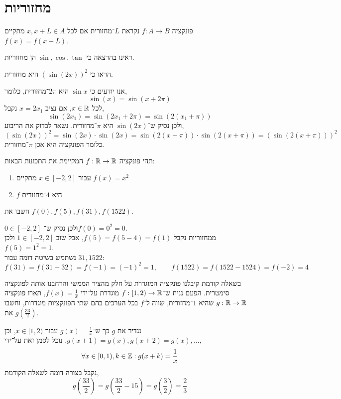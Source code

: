 \section{מחזוריות}
\begin{definition}
	פונקציה $f : A \to B$ נקראת $L$־מחזורית אם לכל $x, x + L \in A$ מתקיים $f(x) = f(x + L)$.
\end{definition}
ראינו בהרצאה כי $\sin, \cos, \tan$ הן מחזוריות.
\begin{exercise}
	הראו כי ${(\sin(2 x))}^2$ היא מחזורית.
\end{exercise}
\begin{solution}
	אנו יודעים כי $\sin x$ היא $2 \pi$־מחזורית, כלומר,
	\[
		\sin(x)
		= \sin(x + 2 \pi)
	\]
	לכל $x \in \mathbb{R}$, אם נציב $x = 2 x_1$ נקבל,
	\[
		\sin(2 x_1)
		= \sin(2 x_1 + 2 \pi)
		= \sin(2 (x_1 + \pi))
	\]
	ולכן נסיק ש־$\sin(2 x)$ היא $\pi$־מחזורית.
	נשאר לבדוק את הריבוע,
	\[
		{(\sin(2 x))}^2
		= \sin(2 x) \cdot \sin(2 x)
		= \sin(2 (x + \pi)) \cdot \sin(2 (x + \pi))
		= {(\sin(2 (x + \pi)))}^2
	\]
	כלומר הפונקציה היא אכן $\pi$־מחזורית.
\end{solution}
\begin{exercise}
	תהי פונקציה $f : \mathbb{R} \to \mathbb{R}$ המקיימת את התכונות הבאות:
	\begin{enumerate}
		\item עבור $x \in [-2, 2]$ מתקיים $f(x) = x^2$
		\item $f$ היא $4$־מחזורית
	\end{enumerate}
	חשבו את $f(0), f(5), f(31), f(1522)$.
\end{exercise}
\begin{solution}
	$0 \in [-2, 2]$ ולכן נסיק ש־$f(0) = 0^2 = 0$. \\
	ממחזוריות נקבל $f(5) = f(5 - 4) = f(1)$, אבל שוב $1 \in [-2, 2]$ ולכן $f(5) = 1^2 = 1$. \\
	נשתמש בשיטה דומה עבור $31, 1522$:
	\[
		f(31)
		= f(31 - 32)
		= f(-1)
		= {(-1)}^2
		= 1,
		\qquad
		f(1522)
		= f(1522 - 1524)
		= f(-2)
		= 4
	\]
\end{solution}
\begin{exercise}
	בשאלה קודמת קיבלנו פונקציה המוגדרת על חלק מהציר הממשי והרחבנו אותה לפונקציה סימטרית.
	הפעם נניח ש־$f : [1, 2) \to \mathbb{R}$ מוגדרת על־ידי $f(x) = \frac{1}{x}$, תארו פונקציה $g : \mathbb{R} \to \mathbb{R}$ שהיא $1$־מחזורית, שווה ל־$f$ בכל הערכים בהם שתי הפונקציות מוגדרות, וחשבו את $g(\frac{33}{2})$.
\end{exercise}
\begin{solution}
	נגדיר את $g$ כך ש־$g(x) = \frac{1}{x}$ עבור $x \in [1, 2)$, וכן $g(x + 1) = g(x), g(x + 2) = g(x), \ldots$.
	נוכל לסמן זאת על־ידי,
	\[
		\forall x \in [0, 1), k \in \mathbb{Z}:
		g(x + k)
		= \frac{1}{x}
	\]
	נקבל בצורה דומה לשאלה הקודמת,
	\[
		g(\frac{33}{2})
		= g(\frac{33}{2} - 15)
		= g(\frac{3}{2})
		= \frac{2}{3}
	\]
\end{solution}

